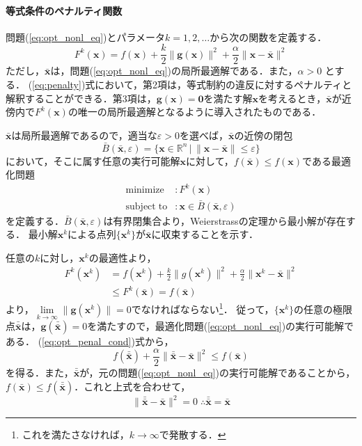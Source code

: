 \documentclass{jsreport}
\begin{document}
\paragraph{等式条件のペナルティ関数}
問題(\ref{eq:opt_nonl_eq})とパラメータ$k = 1, 2, \ldots$から次の関数を定義する．
\begin{equation}\label{eq:penalty}
  F^k(\bm{x}) = f(\bm{x}) + \frac{k}{2}\|\bm{g}(\bm{x})\|^2 + \frac{\alpha}{2}\|\bm{x} - \bar{\bm{x}}\|^2
\end{equation}
ただし，$\bar{\bm{x}}$は，問題(\ref{eq:opt_nonl_eq})の局所最適解である．また，$\alpha > 0$
とする．
(\ref{eq:penalty})式において，第2項は，等式制約の違反に対するペナルティと解釈することができる．第3項は，$\bm{g}(\bm{x}) = \bm{0}$を満たす解$\bm{x}$を考えるとき，$\bar{\bm{x}}$が近傍内で$F^k(\bm{x})$の唯一の局所最適解となるように導入されたものである．

$\bar{\bm{x}}$は局所最適解であるので，適当な$\varepsilon > 0$を選べば，$\bar{\bm{x}}$の近傍の閉包
\begin{equation}
  \bar{B}(\bar{\bm{x}}, \varepsilon) = \{\bm{x} \in \mathbb{R}^n \, | \, \|\bm{x} - \bar{\bm{x}}\| \leq \varepsilon\}
\end{equation}
において，そこに属す任意の実行可能解$\bm{x}$に対して，$f(\bar{\bm{x}}) \leq f(\bm{x})$である最適化問題
\begin{align}\label{eq:opt_penal}
  \mathrm{minimize} &: F^k(\bm{x}) \nonumber\\
  \mathrm{subject \; to} &: \bm{x} \in \bar{B}(\bar{\bm{x}}, \varepsilon)
\end{align}
を定義する．$\bar{B}(\bar{\bm{x}}, \varepsilon)$は有界閉集合より，Weierstrassの定理から最小解が存在する．
最小解$\bm{x}^k$による点列$\{\bm{x}^k\}$が$\bar{\bm{x}}$に収束することを示す．

任意の$k$に対し，$\bm{x}^k$の最適性より，
\begin{align}\label{eq:opt_penal_cond}
  F^k(\bm{x}^k) &= f(\bm{x}^k) + \frac{k}{2}\|g(\bm{x}^k)\|^2 + \frac{\alpha}{2}\|\bm{x}^k - \bar{\bm{x}}\|^2 \nonumber \\
  &\leq F^k(\bar{\bm{x}}) = f(\bar{\bm{x}})
\end{align}
より，$\lim \limits_{k \rightarrow \infty} \|\bm{g}(\bm{x}^k)\| = 0$でなければならない\footnote{これを満たさなければ，$k \rightarrow \infty$で発散する．}．
従って，$\{\bm{x}^k\}$の任意の極限点$\bar{\bar{\bm{x}}}$は，$\bm{g}(\bar{\bar{\bm{x}}}) = 0$を満たすので，最適化問題(\ref{eq:opt_nonl_eq})の実行可能解である．
(\ref{eq:opt_penal_cond})式から，
\begin{equation}
  f(\bar{\bar{\bm{x}}}) + \frac{\alpha}{2}\|\bar{\bar{\bm{x}}} - \bar{\bm{x}}\|^2 \leq f(\bar{\bm{x}}) \nonumber
\end{equation}
を得る．また，$\bar{\bar{\bm{x}}}$が，元の問題(\ref{eq:opt_nonl_eq})の実行可能解であることから，
$f(\bar{\bm{x}}) \leq f(\bar{\bar{\bm{x}}})$．これと上式を合わせて，
\begin{equation}
  \|\bar{\bar{\bm{x}}} - \bar{\bm{x}}\|^2 = 0 \; \therefore \bar{\bar{\bm{x}}} = \bar{\bm{x}} \nonumber
\end{equation}
\end{document}
